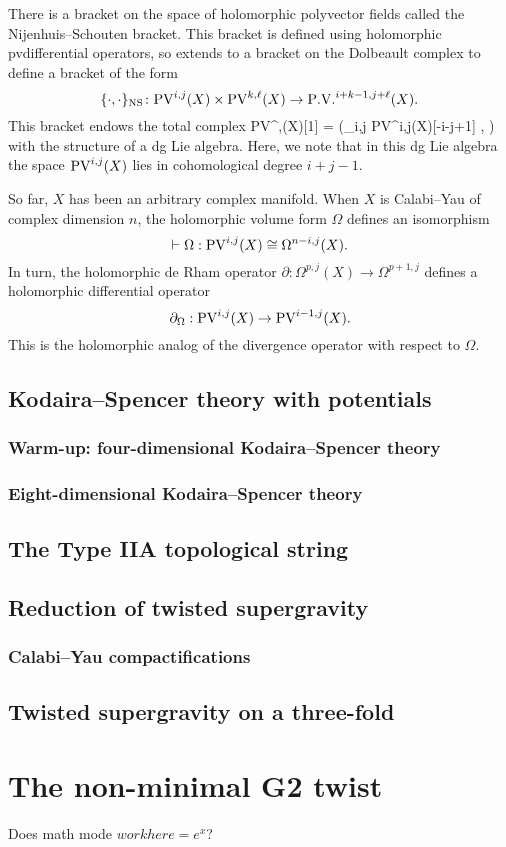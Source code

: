 \documentclass[11pt]{amsart}
\def\pv{{\rm PV}}
\begin{document}
There is a bracket on the space of holomorphic polyvector fields called the Nijenhuis--Schouten bracket.
This bracket is defined using holomorphic pvdifferential operators, so extends to a bracket on the Dolbeault complex to define a bracket of the form
\[
  \{\cdot, \cdot\}_{\rm NS} \colon \pv^{i,j}(X) \times \pv^{k,\ell}(X) \to \PV^{i+k-1, j+\ell}(X) .
\]
This bracket endows the total complex
\beqn\label{eqn:pvlie1}
\pv^{\bu,\bu}(X)[1] = \left(\oplus_{i,j} \pv^{i,j}(X)[-i-j+1] , \dbar \right)
\eeqn
with the structure of a dg Lie algebra.
Here, we note that in this dg Lie algebra the space $\pv^{i,j}(X)$ lies in cohomological degree $i+j-1$.


So far, $X$ has been an arbitrary complex manifold.
When $X$ is Calabi--Yau of complex dimension $n$, the holomorphic volume form $\Omega$ defines an isomorphism
\[
  \vdash \Omega : \pv^{i,j}(X) \cong \Omega^{n-i, j}(X).
\]
In turn, the holomorphic de Rham operator $\partial : \Omega^{p, j}(X) \to \Omega^{p+1,j}$ defines a holomorphic differential operator
\[
  \partial_{\Omega} : \pv^{i,j}(X) \to \pv^{i-1,j}(X) .
\]
This is the holomorphic analog of the divergence operator with respect to $\Omega$.

\subsection{Kodaira--Spencer theory with potentials}
\label{sec:org5e18f8e}
\subsubsection{Warm-up: four-dimensional Kodaira--Spencer theory}
\label{sec:org91dc4ca}
\subsubsection{Eight-dimensional Kodaira--Spencer theory}
\label{sec:orgeb2dd4d}
\subsection{The Type IIA topological string}
\label{sec:org1f7e793}
\subsection{Reduction of twisted supergravity}
\label{sec:orgcf7b6a4}
\subsubsection{Calabi--Yau compactifications}
\label{sec:org16a2c98}
\subsection{Twisted supergravity on a three-fold}
\label{sec:org774abb4}
\section{The non-minimal G2 twist}
\label{sec:org590ab85}
Does math mode \(work here = e^x\)?
\end{document}
